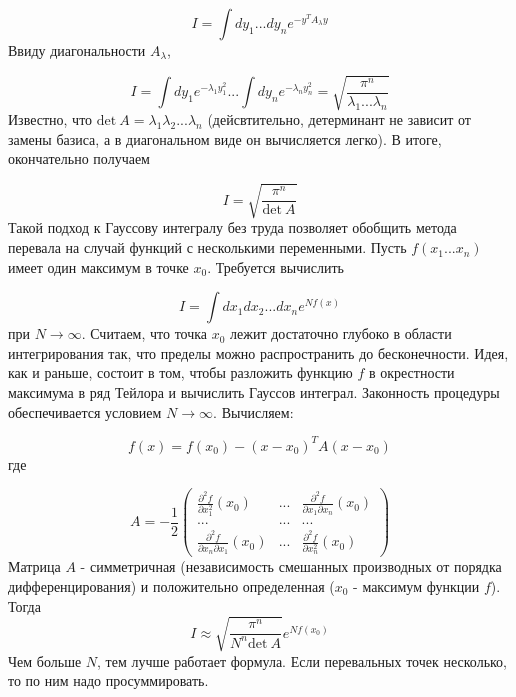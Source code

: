 \documentclass[a4paper,12pt]{article}
\begin{document}
\begin{equation}
I=\int dy_{1}...dy_{n}e^{-y^{T}A_\lambda y}
\end{equation}
Ввиду диагональности
$A_\lambda$,

\begin{equation}
I=\int dy_{1}e^{-\lambda_{1}y_{1}^{2}}...\int dy_{n}e^{-\lambda_{n}y_{n}^{2}}=\sqrt{\frac{\pi^{n}}{\lambda_{1}...\lambda_{n}}}
\end{equation}
Известно, что
$\mathrm{det}\:A=\lambda_{1}\lambda_{2}...\lambda_{n}$ (дейсвтительно, детерминант не зависит от замены базиса, а в диагональном виде он вычисляется легко). В итоге, окончательно получаем

\begin{equation}
I=\sqrt{\frac{\pi^{n}}{\mathrm{det}\: A}}
\end{equation}
Такой подход к Гауссову интегралу без труда позволяет обобщить метода перевала на случай функций с несколькими переменными. Пусть $f(x_{1}...x_{n})$ имеет один максимум в точке $x_{0}$. Требуется вычислить

\begin{equation}
I=\int dx_{1}dx_{2}...dx_{n}e^{Nf(x)}
\end{equation}
при $N\rightarrow\infty$. Считаем, что точка $x_{0}$
лежит достаточно глубоко в области интегрирования так, что пределы можно распространить до бесконечности. Идея, как и раньше, состоит в том, чтобы разложить функцию $f$ в окрестности максимума в ряд Тейлора и вычислить Гауссов интеграл. Законность процедуры обеспечивается условием $N\rightarrow\infty$. Вычисляем:

\begin{equation}
f(x)=f(x_{0})-(x-x_{0})^{T}A(x-x_{0})
\end{equation}
где

\begin{equation}
A=-\frac{1}{2}\left(\begin{array}{ccc}
\frac{\partial^{2}f}{\partial x_{1}^{2}}(x_{0}) & ... & \frac{\partial^{2}f}{\partial x_{1}\partial x_{n}}(x_{0})\\
... & ... & ...\\
\frac{\partial^{2}f}{\partial x_{n}\partial x_{1}}(x_{0}) & ... & \frac{\partial^{2}f}{\partial x_{n}^{2}}(x_{0})
\end{array}\right)
\end{equation}
Матрица $A$ - симметричная (независимость смешанных производных от порядка дифференцирования) и положительно определенная ($x_0$ - максимум функции $f$). Тогда
\begin{equation}
I\approx\sqrt{\frac{\pi^{n}}{N^{n}\mathrm{det}\: A}}e^{Nf(x_{0})}
\end{equation}
Чем больше $N$, тем лучше работает формула. Если перевальных точек несколько, то по ним надо просуммировать.
\end{document}
